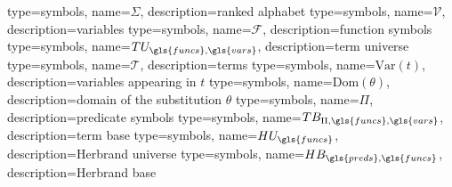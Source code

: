 
\makeglossary

{
    type=symbols,
    name={\ensuremath{\Sigma}},
    description={ranked alphabet}
}
{
    type=symbols,
    name={\ensuremath{\mathcal{V}}},
    description={variables}
}
{
    type=symbols,
    name={\ensuremath{\mathcal{F}}},
    description={function symbols}
}
{
    type=symbols,
    name={\ensuremath{TU_{\gls{funcs},\gls{vars}}}},
    description={term universe}
}
{
    type=symbols,
    name={\ensuremath{\mathcal{T}}},
    description={terms}
}
{
    type=symbols,
    name={\ensuremath{\mathrm{Var}(t)}},
    description={variables appearing in \(t\)}
}
{
    type=symbols,
    name={\ensuremath{\mathrm{Dom}(\theta)}},
    description={domain of the substitution \(\theta\)}
}
{
    type=symbols,
    name={\ensuremath{\Pi}},
    description={predicate symbols}
}
{
    type=symbols,
    name={\ensuremath{TB_{\Pi,\gls{funcs},\gls{vars}}}},
    description={term base}
}
{
    type=symbols,
    name={\ensuremath{HU_{\gls{funcs}}}},
    description={Herbrand universe}
}
{
    type=symbols,
    name={\ensuremath{HB_{\gls{preds},\gls{funcs}}}},
    description={Herbrand base}
}